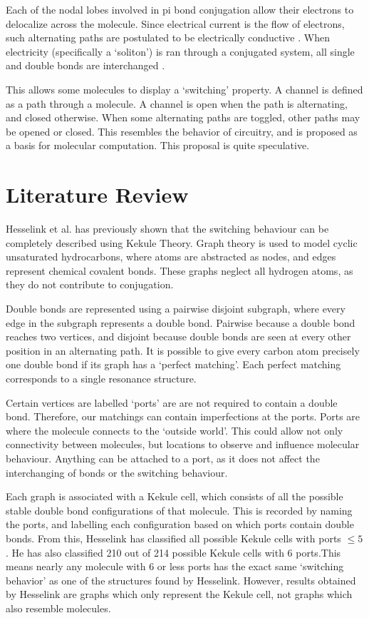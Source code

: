 \documentclass[12pt]{article}
\begin{document}
Each of the nodal lobes involved in pi bond conjugation allow their electrons to delocalize across the molecule. Since electrical current is the flow of electrons, such alternating paths are postulated to be electrically conductive \cite{H13,HK88}. When electricity (specifically a `soliton') is ran through a conjugated system, all single and double bonds are interchanged \cite{HK88}. 

This allows some molecules to display a `switching' property. A channel is defined as a path through a molecule. A channel is open when the path is alternating, and closed otherwise. When some alternating paths are toggled, other paths may be opened or closed. This resembles the behavior of circuitry, and is proposed as a basis for molecular computation. This proposal is quite speculative.

\section{Literature Review}

	Hesselink et al. \cite{H13,HH13} has previously shown that the switching behaviour can be completely described using Kekule Theory. Graph theory is used to model cyclic unsaturated hydrocarbons, where atoms are abstracted as nodes, and edges represent chemical covalent bonds. These graphs neglect all hydrogen atoms, as they do not contribute to conjugation. 

Double bonds are represented using a pairwise disjoint subgraph, where every edge in the subgraph represents a double bond. Pairwise because a double bond reaches two vertices, and disjoint because double bonds are seen at every other position in an alternating path. It is possible to give every carbon atom precisely one double bond if its graph has a `perfect matching'. Each perfect matching corresponds to a single resonance structure. 

Certain vertices are labelled `ports' are are not required to contain a double bond. Therefore, our matchings can contain imperfections at the ports.  Ports are where the molecule connects to the `outside world'. This could allow not only connectivity between molecules, but locations to observe and influence molecular behaviour. Anything can be attached to a port, as it does not affect the interchanging of bonds or the switching behaviour.

Each graph is associated with a Kekule cell, which consists of all the possible stable double bond configurations of that molecule. This is recorded by naming the ports, and labelling each configuration based on which ports contain double bonds. From this, Hesselink has classified all possible Kekule cells with ports $ \leq 5$. He has also classified 210 out of 214 possible Kekule cells with 6 ports.This means nearly any molecule with 6 or less ports has the exact same `switching behavior' as one of the structures found by Hesselink. However, results obtained by Hesselink are graphs which only represent the Kekule cell, not graphs which also resemble molecules. 
	                 
\end{document}
